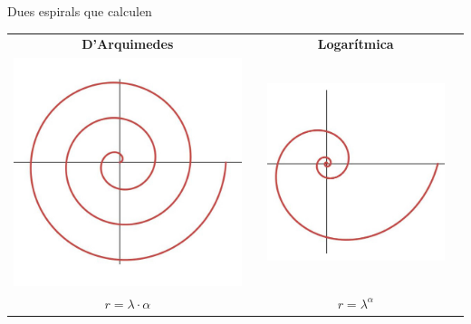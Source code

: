 \documentclass[14pt]{beamer}
\begin{document}

    \begin{frame}{Dues espirals que calculen}
        \begin{center}
            \begin{tabular}{cccc}
                \textbf{D'Arquimedes} & \qquad & \textbf{Logarítmica} & \quad \\[1ex]
                \includegraphics[width=20ex]{pictures/Arquimedes.jpg} & & 
                \includegraphics[width=20ex]{pictures/Logaritmica.jpg} & \\[1ex]
                {\Large $r = \lambda\cdot\alpha$ } & & {\Large $r = \lambda^\alpha$ } & \\
            \end{tabular}
        \end{center}
    \end{frame}

\end{document}
